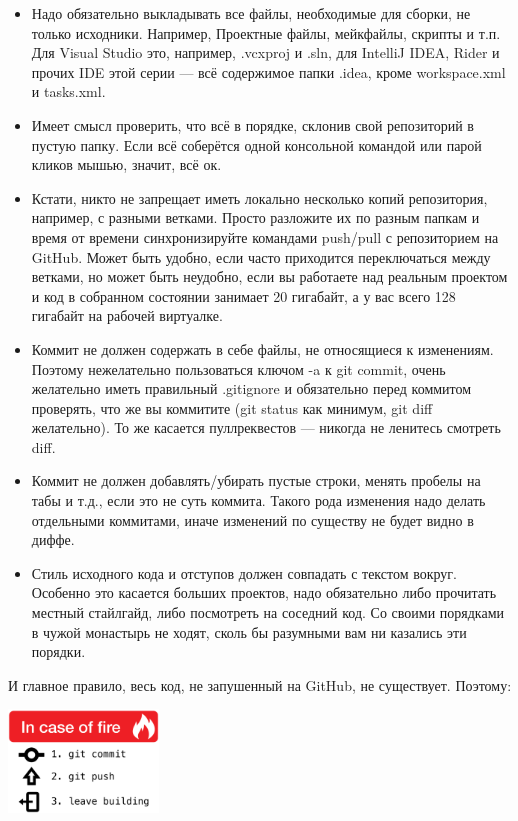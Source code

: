 \documentclass{../../text-style}
\begin{document}
\begin{itemize}
    \item Надо обязательно выкладывать все файлы, необходимые для сборки, не только исходники. Например, Проектные файлы, мейкфайлы, скрипты и т.п. Для Visual Studio это, например, .vcxproj и .sln, для IntelliJ IDEA, Rider и прочих IDE этой серии --- всё содержимое папки .idea, кроме workspace.xml и tasks.xml.
    \item Имеет смысл проверить, что всё в порядке, склонив свой репозиторий в пустую папку. Если всё соберётся одной консольной командой или парой кликов мышью, значит, всё ок.
    \item Кстати, никто не запрещает иметь локально несколько копий репозитория, например, с разными ветками. Просто разложите их по разным папкам и время от времени синхронизируйте командами push/pull с репозиторием на GitHub. Может быть удобно, если часто приходится переключаться между ветками, но может быть неудобно, если вы работаете над реальным проектом и код в собранном состоянии занимает 20 гигабайт, а у вас всего 128 гигабайт на рабочей виртуалке.
    \item Коммит не должен содержать в себе файлы, не относящиеся к изменениям. Поэтому нежелательно пользоваться ключом -a к git commit, очень желательно иметь правильный .gitignore и обязательно перед коммитом проверять, что же вы коммитите (git status как минимум, git diff желательно). То же касается пуллреквестов --- никогда не ленитесь смотреть diff.
    \item Коммит не должен добавлять/убирать пустые строки, менять пробелы на табы и т.д., если это не суть коммита. Такого рода изменения надо делать отдельными коммитами, иначе изменений по существу не будет видно в диффе.
    \item Стиль исходного кода и отступов должен совпадать с текстом вокруг. Особенно это касается больших проектов, надо обязательно либо прочитать местный стайлгайд, либо посмотреть на соседний код. Со своими порядками в чужой монастырь не ходят, сколь бы разумными вам ни казались эти порядки.
\end{itemize}

И главное правило, весь код, не запушенный на GitHub, не существует. Поэтому:

\begin{center}
    \includegraphics[width=0.3\textwidth]{inCaseOfFire.png}
\end{center}
\end{document}
